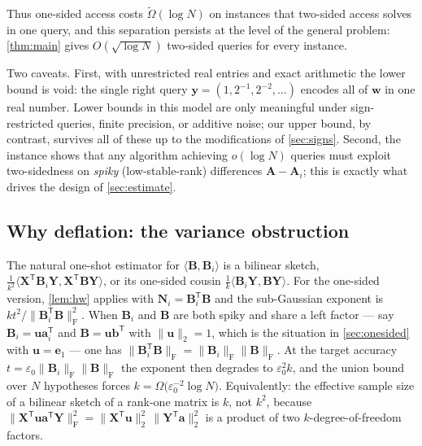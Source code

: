 \documentclass{article}
\renewcommand{\vec}[1]{\mathbf{#1}}          %
\newcommand{\T}{\mathsf{T}}                  %
\newcommand{\F}{\mathrm{F}}                  %
\newcommand{\eps}{\varepsilon}
\newcommand{\inner}[2]{\langle #1, #2 \rangle}
\theoremstyle{remark}
\begin{document}
Thus one-sided access costs $\widetilde{\Omega}(\log N)$ on instances that two-sided access solves in one query, and this separation persists at the level of the general problem: \cref{thm:main} gives $O(\sqrt{\log N})$ two-sided queries for every instance.

Two caveats.
First, with unrestricted real entries and exact arithmetic the lower bound is void: the single right query $\vec{y} = (1, 2^{-1}, 2^{-2}, \dots)$ encodes all of $\vec{w}$ in one real number.
Lower bounds in this model are only meaningful under sign-restricted queries, finite precision, or additive noise; our upper bound, by contrast, survives all of these up to the modifications of \cref{sec:signs}.
Second, the instance shows that any algorithm achieving $o(\log N)$ queries must exploit two-sidedness on \emph{spiky} (low-stable-rank) differences $\vec{A} - \vec{A}_i$; this is exactly what drives the design of \cref{sec:estimate}.

\subsection{Why deflation: the variance obstruction}\label{sec:whydeflation}

The natural one-shot estimator for $\inner{\vec{B}}{\vec{B}_i}$ is a bilinear sketch, $\frac{1}{k^2}\inner{\vec{X}^\T\vec{B}_i\vec{Y}}{\vec{X}^\T\vec{B}\vec{Y}}$, or its one-sided cousin $\frac{1}{k}\inner{\vec{B}_i\vec{Y}}{\vec{B}\vec{Y}}$.
For the one-sided version, \cref{lem:hw} applies with $\vec{N}_i = \vec{B}_i^\T\vec{B}$ and the sub-Gaussian exponent is $k t^2 / \|\vec{B}_i^\T\vec{B}\|_\F^2$.
When $\vec{B}_i$ and $\vec{B}$ are both spiky and share a left factor --- say $\vec{B}_i = \vec{u}\vec{a}_i^\T$ and $\vec{B} = \vec{u}\vec{b}^\T$ with $\|\vec{u}\|_2 = 1$, which is the situation in \cref{sec:onesided} with $\vec{u} = \vec{e}_1$ --- one has $\|\vec{B}_i^\T\vec{B}\|_\F = \|\vec{B}_i\|_\F\|\vec{B}\|_\F$.
At the target accuracy $t = \eps_0\|\vec{B}_i\|_\F\|\vec{B}\|_\F$ the exponent then degrades to $\eps_0^2 k$, and the union bound over $N$ hypotheses forces $k = \Omega\bigl(\eps_0^{-2}\log N\bigr)$.
Equivalently: the effective sample size of a bilinear sketch of a rank-one matrix is $k$, not $k^2$, because $\|\vec{X}^\T\vec{u}\vec{a}^\T\vec{Y}\|_\F^2 = \|\vec{X}^\T\vec{u}\|_2^2\,\|\vec{Y}^\T\vec{a}\|_2^2$ is a product of two $k$-degree-of-freedom factors.
\end{document}
